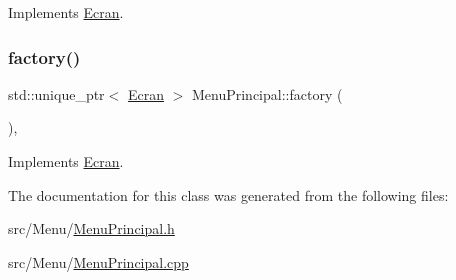 Implements \mbox{\hyperlink{class_ecran_a764dadf20079744d3f5dd633eae268cc}{Ecran}}.

\mbox{\label{class_menu_principal_aa00616cf1c159b871ecbea2807be2687}} 
\subsubsection{\texorpdfstring{factory()}{factory()}}
{\footnotesize\ttfamily std\+::unique\+\_\+ptr$<$ \mbox{\hyperlink{class_ecran}{Ecran}} $>$ Menu\+Principal\+::factory (\begin{DoxyParamCaption}{ }\end{DoxyParamCaption})\hspace{0.3cm}{\ttfamily [override]}, {\ttfamily [virtual]}}



Implements \mbox{\hyperlink{class_ecran_a016213731438ce2fb37831d8b0eeabed}{Ecran}}.



The documentation for this class was generated from the following files\+:\begin{DoxyCompactItemize}
\item 
src/\+Menu/\mbox{\hyperlink{_menu_principal_8h}{Menu\+Principal.\+h}}\item 
src/\+Menu/\mbox{\hyperlink{_menu_principal_8cpp}{Menu\+Principal.\+cpp}}\end{DoxyCompactItemize}
